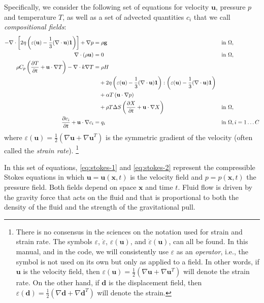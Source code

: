 \documentclass{article}
\begin{document}
Specifically, we consider the following set of equations for velocity $\mathbf
u$, pressure $p$ and temperature $T$, as well as a set of advected quantities
$c_i$ that we call \textit{compositional fields}:
\begin{align}
  \label{eq:stokes-1}
  -\nabla \cdot \left[2\eta \left(\varepsilon(\mathbf u)
                                  - \frac{1}{3}(\nabla \cdot \mathbf u)\mathbf 1\right)
                \right] + \nabla p &=
  \rho \mathbf g
  &
  & \textrm{in $\Omega$},
  \\
  \label{eq:stokes-2}
  \nabla \cdot (\rho \mathbf u) &= 0
  &
  & \textrm{in $\Omega$},
  \\
  \label{eq:temperature}
  \rho C_p \left(\frac{\partial T}{\partial t} + \mathbf u\cdot\nabla T\right)
  - \nabla\cdot k\nabla T
  &=
  \rho H
  \notag
  \\
  &\quad
  +
  2\eta
  \left(\varepsilon(\mathbf u) - \frac{1}{3}(\nabla \cdot \mathbf u)\mathbf 1\right)
  :
  \left(\varepsilon(\mathbf u) - \frac{1}{3}(\nabla \cdot \mathbf u)\mathbf 1\right)
  \\
  &\quad
  +\alpha T \left( \mathbf u \cdot \nabla p \right)
  \notag
  \\
  &\quad
  + \rho T \Delta S \left(\frac{\partial X}{\partial t} + \mathbf u\cdot\nabla X\right)
  &
  & \textrm{in $\Omega$},
  \notag
  \\
  \label{eq:compositional}
  \frac{\partial c_i}{\partial t} + \mathbf u\cdot\nabla c_i
  &=
  q_i
  &
  & \textrm{in $\Omega$},
  i=1\ldots C
\end{align}
where $\varepsilon(\mathbf u) = \frac{1}{2}(\nabla \mathbf u + \nabla\mathbf
u^T)$ is the symmetric gradient of the velocity (often called the
\textit{strain rate}).%
\footnote{There is no consensus in the sciences on the notation used
  for strain and strain rate. The symbols $\varepsilon$,
  $\dot\varepsilon$,  $\varepsilon(\mathbf u)$, and
  $\dot\varepsilon(\mathbf u)$, can all be found. In this manual, and
  in the code, we will consistently use $\varepsilon$ as an
  \textit{operator}, i.e., the symbol is not used on its own but only
  as applied to a field. In other words, if $\mathbf u$ is the
  velocity field, then $\varepsilon(\mathbf u) = \frac{1}{2}(\nabla
  \mathbf u + \nabla\mathbf u^T)$ will denote the strain rate. On the
  other hand, if $\mathbf d$ is the
  displacement field, then $\varepsilon(\mathbf d) = \frac{1}{2}(\nabla
  \mathbf d + \nabla\mathbf d^T)$ will denote the strain.}


In this set of equations, \eqref{eq:stokes-1} and \eqref{eq:stokes-2}
represent the compressible Stokes equations in which $\mathbf u=\mathbf
u(\mathbf x,t)$ is the velocity field and $p=p(\mathbf x,t)$ the pressure
field. Both fields depend on space $\mathbf x$ and time $t$. Fluid flow is
driven by the gravity force that acts on the fluid and that is proportional to
both the density of the fluid and the strength of the gravitational pull.
\end{document}
